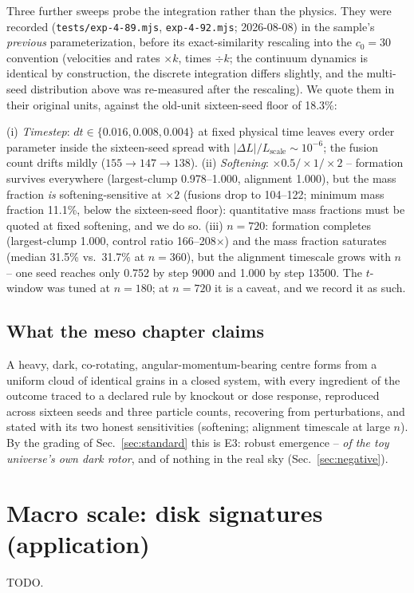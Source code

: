 \documentclass[aps,reprint,amsmath,amssymb,nofootinbib,superscriptaddress,floatfix]{revtex4-2}
\begin{document}
Three further sweeps probe the integration rather than the physics.
They were recorded (\texttt{tests/exp-4-89.mjs},
\texttt{exp-4-92.mjs}; 2026-08-08) in the sample's \emph{previous}
parameterization, before its exact-similarity rescaling into the
$c_0=30$ convention (velocities and rates $\times k$, times $\div k$;
the continuum dynamics is identical by construction, the discrete
integration differs slightly, and the multi-seed distribution above was
re-measured after the rescaling). We quote them in their original
units, against the old-unit sixteen-seed floor of 18.3\%:

(i) \emph{Timestep}: $dt \in \{0.016, 0.008, 0.004\}$ at fixed physical
time leaves every order parameter inside the sixteen-seed spread with
$|\Delta L|/L_{\mathrm{scale}}\sim10^{-6}$; the fusion count drifts
mildly ($155\rightarrow147\rightarrow138$). (ii) \emph{Softening}:
$\times0.5/\times1/\times2$ -- formation survives everywhere
(largest-clump 0.978--1.000, alignment 1.000), but the mass fraction
\emph{is} softening-sensitive at $\times2$ (fusions drop to 104--122;
minimum mass fraction 11.1\%, below the sixteen-seed floor):
quantitative mass fractions must be quoted at fixed softening, and we
do so. (iii) \emph{$n=720$}: formation completes (largest-clump 1.000,
control ratio 166--208$\times$) and the mass fraction saturates
(median 31.5\% vs.\ 31.7\% at $n=360$), but the alignment timescale
grows with $n$ -- one seed reaches only 0.752 by step 9000 and 1.000 by
step 13500. The $t$-window was tuned at $n=180$; at $n=720$ it is a
caveat, and we record it as such.

\subsection{What the meso chapter claims}

A heavy, dark, co-rotating, angular-momentum-bearing centre forms from
a uniform cloud of identical grains in a closed system, with every
ingredient of the outcome traced to a declared rule by knockout or dose
response, reproduced across sixteen seeds and three particle counts,
recovering from perturbations, and stated with its two honest
sensitivities (softening; alignment timescale at large $n$). By the
grading of Sec.~\ref{sec:standard} this is E3: robust emergence --
\emph{of the toy universe's own dark rotor}, and of nothing in the real
sky (Sec.~\ref{sec:negative}).

\section{Macro scale: disk signatures (application)}
\label{sec:macro}
TODO.
\end{document}
